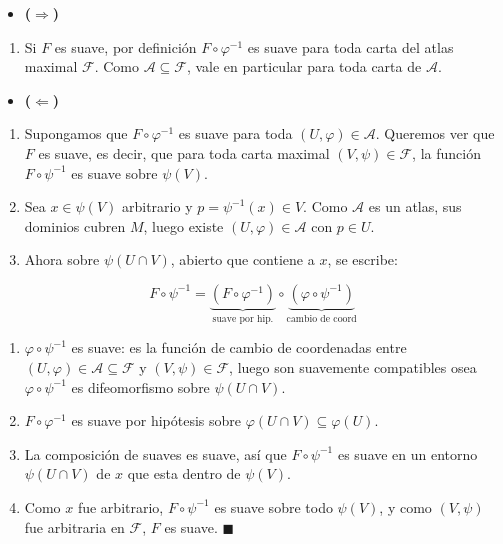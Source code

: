 \begin{bookproof}{}
\begin{itemize}
\item \textbf{($\Rightarrow$)}
\end{itemize}
\begin{enumerate}
\item Si $F$ es suave, por definición $F\circ\varphi^{-1}$ es suave para toda carta del atlas maximal $\mathcal{F}$. Como $\mathcal{A}\subseteq\mathcal{F}$, vale en particular para toda carta de $\mathcal{A}$.
\end{enumerate}
\begin{itemize}
\item \textbf{($\Leftarrow$)}
\end{itemize}
\begin{enumerate}
\item Supongamos que $F\circ\varphi^{-1}$ es suave para toda $(U,\varphi)\in\mathcal{A}$. Queremos ver que $F$ es suave, es decir, que para toda carta maximal $(V,\psi)\in\mathcal{F}$, la función $F\circ\psi^{-1}$ es suave sobre $\psi(V)$.
\item Sea $x\in\psi(V)$ arbitrario y $p=\psi^{-1}(x)\in V$. Como $\mathcal{A}$ es un atlas, sus dominios cubren $M$, luego existe $(U,\varphi)\in\mathcal{A}$ con $p\in U$.
\item Ahora sobre $\psi(U\cap V)$, abierto que contiene a $x$, se escribe:
\end{enumerate}
\[
F\circ\psi^{-1}=\underbrace{(F\circ\varphi^{-1})}_{\text{suave por hip.}}\circ\underbrace{(\varphi\circ\psi^{-1})}_{\text{cambio de coord}}
\]
\begin{enumerate}[start=4]
\item $\varphi\circ\psi^{-1}$ es suave: es la función de cambio de coordenadas entre $(U,\varphi)\in\mathcal{A}\subseteq\mathcal{F}$ y $(V,\psi)\in\mathcal{F}$, luego son suavemente compatibles osea $\varphi\circ\psi^{-1}$ es difeomorfismo sobre $\psi(U\cap V)$.
\item $F\circ\varphi^{-1}$ es suave por hipótesis sobre $\varphi(U\cap V)\subseteq\varphi(U)$.
\item La composición de suaves es suave, así que $F\circ\psi^{-1}$ es suave en un entorno $\psi(U\cap V)$ de $x$ que esta dentro de $\psi(V)$.
\item Como $x$ fue arbitrario, $F\circ\psi^{-1}$ es suave sobre todo $\psi(V)$, y como $(V,\psi)$ fue arbitraria en $\mathcal{F}$, $F$ es suave. $\blacksquare$
\end{enumerate}
\bookqed
\end{bookproof}

